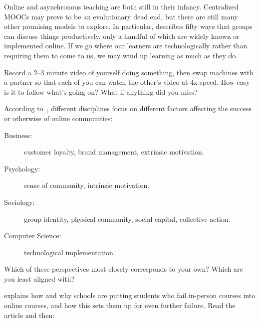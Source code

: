 Online and asynchronous teaching are both still in their infancy.
Centralized MOOCs may prove to be an evolutionary dead end,
but there are still many other promising models to explore.
In particular,
\cite{Broo2016} describes fifty ways that groups can discuss things productively,
only a handful of which are widely known or implemented online.
If we go where our learners are technologically
rather than requiring them to come to us,
we may wind up learning as much as they do.



Record a 2--3 minute video of yourself doing something,
then swap machines with a partner
so that each of you can watch the other's video at 4x speed.
How easy is it to follow what's going on?
What if anything did you miss?


According to~\cite{Irib2009},
different disciplines focus on different factors
affecting the success or otherwise of online communities:

\begin{description}

\item[Business:]
  customer loyalty, brand management, extrinsic motivation.

\item[Psychology:]
  sense of community, intrinsic motivation.

\item[Sociology:]
  group identity, physical community, social capital, collective action.

\item[Computer Science:]
  technological implementation.

\end{description}

Which of these perspectives most closely corresponds to your own?
Which are you least aligned with?


explains how and why schools are putting students who fail in-person courses into online courses,
and how this sets them up for even further failure.
Read the article and then:

